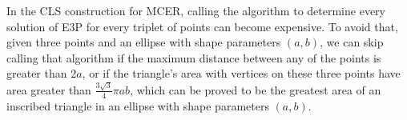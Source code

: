

In the CLS construction for MCER, calling the algorithm to determine every solution of E3P for every triplet of points can become expensive. To avoid that, given three points and an ellipse with shape parameters $(a, b)$, we can skip calling that  algorithm if the maximum distance between any of the points is greater than $2a$, or if the triangle's area with vertices on these three points have area greater than $\frac{3\sqrt{3}}{4}\pi ab$, which can be proved to be the greatest area of an inscribed triangle in an ellipse with shape parameters $(a, b)$.
